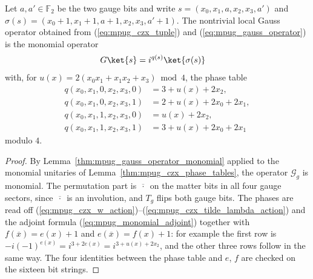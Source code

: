 \begin{lemma}
    \label{thm:mpug_czx_local_monomial_action}
    \leanok
    Let $a,a'\in\mathbb F_2$ be the two gauge bits and write
    $s=(x_0,x_1,a,x_2,x_3,a')$ and
    $\sigma(s)=(x_0+1,x_1+1,a+1,x_2,x_3,a'+1)$. The nontrivial local Gauss
    operator obtained from (\ref{eq:mpug_czx_tuple}) and
    (\ref{eq:mpug_gauss_operator}) is the monomial operator
    \begin{align}
        G\ket{s} & =i^{q(s)}\ket{\sigma(s)}
        \label{eq:mpug_czx_monomial_action}
    \end{align}
    with, for $u(x)=2(x_0x_1+x_1x_2+x_3)\bmod4$, the phase table
    \begin{align}
        q(x_0,x_1,0,x_2,x_3,0) & =3+u(x)+2x_2,      \\
        q(x_0,x_1,0,x_2,x_3,1) & =2+u(x)+2x_0+2x_1, \\
        q(x_0,x_1,1,x_2,x_3,0) & =u(x)+2x_2,        \\
        q(x_0,x_1,1,x_2,x_3,1) & =3+u(x)+2x_0+2x_1
        \label{eq:mpug_czx_phase_table}
    \end{align}
    modulo $4$.
\end{lemma}

\begin{proof}\leanok
    By Lemma~\ref{thm:mpug_gauss_operator_monomial} applied to the monomial
    unitaries of Lemma~\ref{thm:mpug_czx_phase_tables}, the operator
    $\mathcal G_g$ is monomial. The permutation part is
    $\overline{\,\cdot\,}$ on the matter bits in all four gauge sectors,
    since $\overline{\,\cdot\,}$ is an involution, and $T_g$ flips both
    gauge bits. The phases are read off
    (\ref{eq:mpug_czx_w_action})--(\ref{eq:mpug_czx_tilde_lambda_action})
    and the adjoint formula (\ref{eq:mpug_monomial_adjoint}) together with
    $f(\overline x)=e(x)+1$ and $e(\overline x)=f(x)+1$: for example the
    first row is $-i(-1)^{e(x)}=i^{3+2e(x)}=i^{3+u(x)+2x_2}$, and the other
    three rows follow in the same way. The four identities between the phase
    table and $e$, $f$ are checked on the sixteen bit strings.
\end{proof}

